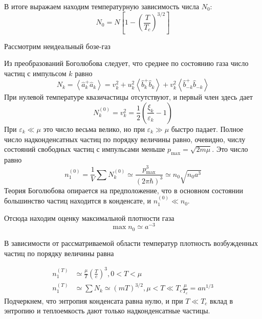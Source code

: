\documentclass[a4paper,12pt]{article} %
\begin{document}
\begin{ttask}
В итоге выражаем находим температурную зависимость числа $N_{0}:$
$$
N_{0}=N\left[1-\left(\frac{T}{T_{c}}\right)^{3 / 2}\right]
$$





Рассмотрим неидеальный бозе-газ



Из преобразований Боголюбова следует, что среднее по состоянию газа число частиц с импульсом $k$ равно
$$
N_{k}=\left\langle\hat{a}_{k}^{+} \hat{a}_{k}\right\rangle=v_{k}^{2}+u_{k}^{2}\left\langle\hat{b}_{k}^{+} \hat{b}_{k}\right\rangle+v_{k}^{2}\left\langle\hat{b}_{-k}^{+} \hat{b}_{-k}\right\rangle
$$
При нулевой температуре квазичастицы отсутствуют, и первый член здесь дает
$$
N_{k}^{(0)}
=
v_{k}^{2}
=
\frac{1}{2}\left(
\frac{\xi_{k}}{\varepsilon_{k}}-1
\right)
$$
При $\varepsilon_{k} \ll \mu$ это число весьма велико, но при $\varepsilon_{k} \gg \mu$ быстро падает. 
Полное число надконденсатных частиц по порядку величины равно, очевидно, 
числу состояний свободных частиц с импульсами меньше $p_{\max }=\sqrt{2 m \mu} .$ 
Это число равно
$$
n_{1}^{(0)}
=
\frac{1}{V} \sum N_{k}^{(0)} 
\simeq 
\frac{p_{\max }^{3}}{(2 \pi \hbar)^{3}} 
\simeq 
n_{0} \sqrt{n_{0} a^{3}}
$$
Теория Боголюбова опирается на предположение, 
что в основном состоянии большинство частиц находится в конденсате, и $n_{1}^{(0)} \ll n_{0} .$ 


Отсюда находим оценку максимальной плотности газа
\[ \max n_{0} \simeq a^{-3} \]


В зависимости от рассматриваемой области температур плотность возбужденных частиц по порядку величины равна



$$
\begin{aligned}
	n_{1}^{(T)} & \simeq \frac{\mu}{T}\left(\frac{T}{c}\right)^{3}, 0<T<\mu \\
	n_{1}^{(T)} & \simeq \sum N_{k} \simeq(m T)^{3 / 2}, \mu<T \ll T_{c} \frac{\mu}{T_{c}}=a n^{1 / 3}
\end{aligned}
$$
Подчеркнем, что энтропия конденсата равна нулю, и при $T \ll T_{c}$ вклад в энтропию и теплоемкость дают только надконденсатные частицы.






\end{ttask}
\end{document}
